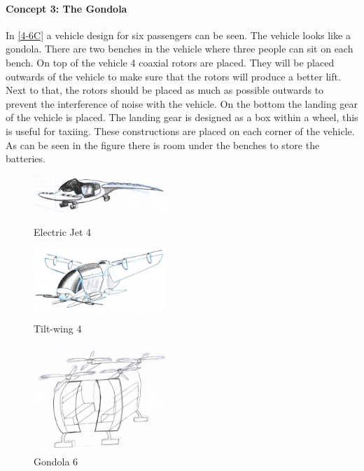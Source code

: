 \paragraph{Concept 3: The Gondola}
In \autoref{4-6C} a vehicle design for six passengers can be seen. The vehicle looks like a gondola. There are two benches in the vehicle where three people can sit on each bench. On top of the vehicle 4 coaxial rotors are placed. They will be placed outwards of the vehicle to make sure that the rotors will produce a better lift. Next to that, the rotors should be placed as much as possible outwards to prevent the interference of noise with the vehicle. On the bottom the landing gear of the vehicle is placed. The landing gear is designed as a box within a wheel, this is useful for taxiing. These constructions are placed on each corner of the vehicle. As can be seen in the figure there is room under the benches to store the batteries. 
\begin{figure}[H]
  \centering
  \begin{minipage}[b]{0.25\textwidth}
    \includegraphics[width=5.0cm]{./Figures/ejet.jpg}
    \captionsetup{justification=centering}
    \caption{Electric Jet 4}
    \label{4-6A}
  \end{minipage}
  \hspace{1.5cm}
  \begin{minipage}[b]{0.30\textwidth}
    \includegraphics[width=5.0cm]{./Figures/bumblebee.jpg}
    \captionsetup{justification=centering}
    \caption{Tilt-wing 4}
    \label{4-6B}
  \end{minipage}
  \hspace{0.5cm}
  \begin{minipage}[b]{0.25\textwidth}
    \includegraphics[width=5.0cm]{./Figures/carriage.jpg}
    \captionsetup{justification=centering}
    \caption{Gondola 6}
    \label{4-6C}
  \end{minipage}  
\end{figure}


